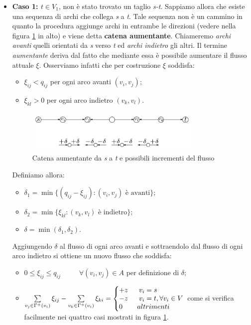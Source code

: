 \documentclass[11pt]{book}
\makeatletter
\newenvironment{sistema}%
{\left\lbrace\begin{array}{@{}l@{}}}%
{\end{array}\right.}
\makeatother
\begin{document}
\begin{itemize}
  
\item {\bf Caso 1: $t \in V_1$}, non \`e stato trovato un taglio {\em
  s-t}. Sappiamo allora che esiste una sequenza di archi che collega
  {\em s} a {\em t}. Tale sequenza non \`e un cammino in quanto la
  procedura aggiunge archi in entrambe le direzioni (vedere nella
  figura \ref{cap7fig77} in alto) e viene detta {\bf catena
    aumentante}. Chiameremo {\em archi avanti} quelli orientati da
  {\em s} verso {\em t} ed {\em archi indietro} gli altri. Il termine
  {\em aumentante} deriva dal fatto che mediante essa \`e possibile
  aumentare il flusso attuale $\xi$. Osserviamo infatti che per
  costruzione $\xi$ soddisfa:

  \begin{itemize}
  \item $\xi_{ij} < q_{ij}$ per ogni arco avanti $(v_i,v_j)$;
  \item $\xi_{kl} > 0$ per ogni arco indietro $(v_k,v_l)$.
  \end{itemize}

  \begin{figure}[H]
    \centering
    \includegraphics[width=0.8\textwidth]{images/cap7fig77.png}
    \caption{Catena aumentante da {\em s} a {\em t} e possibili
      incrementi del flusso}
    \label{cap7fig77}
  \end{figure}

  Definiamo allora:

  \begin{itemize}
  \item $\delta_1 = \min \{(q_{ij} - \xi_{ij}): (v_i,v_j) \text{ \`e
    avanti}\}$;
  \item $\delta_2 = \min \{ \xi_{kl}: (v_k,v_l) \text{ \`e indietro}
    \}$;
  \item $\delta = \min (\delta_1,\delta_2)$.
  \end{itemize}

  Aggiungendo $\delta$ al flusso di ogni arco avanti e sottraendolo
  dal flusso di ogni arco indietro si ottiene un nuovo flusso che
  soddisfa:

  \begin{itemize}
  \item $0 \leq \xi_{ij} \leq q_{ij}\phantom{aaaaa}\forall (v_i, v_j)
    \in A$ per definizione di $\delta$;
  \item $\sum\limits_{v_j \in \Gamma^+ (v_i)}\xi_{ij} - \sum\limits_{v_k \in \Gamma^+ (v_i)}\xi_{ki} = \begin{sistema}
    +z\phantom{aaa}v_i=s\\
    -z\phantom{aaa}v_i=t, \forall v_i \in V\\
    0\phantom{aaaa}altrimenti
  \end{sistema}$ come si verifica facilmente nei quattro casi mostrati
    in figura \ref{cap7fig77}.
  \end{itemize}


\end{itemize}
\end{document}
